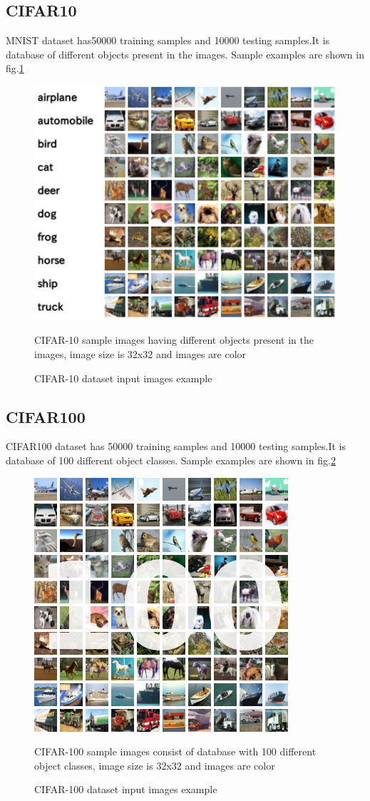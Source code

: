 \subsection{CIFAR10}
MNIST dataset has50000 training samples and 10000 testing samples.It is database of different objects present in the images. Sample examples are shown in fig.\ref{fig:cifar10_example}

\begin{figure}[H]\label{fig:cifar10_example}
	\centering
	\includegraphics[scale=0.8]{Images/cifar10}
	\caption{CIFAR-10 dataset input images example}
	\medskip
	\small
	CIFAR-10 sample images having different objects present in the images, image size is 32x32 and images are color
\end{figure}

\subsection{CIFAR100}
CIFAR100 dataset has 50000 training samples and 10000 testing samples.It is database of 100 different object classes. Sample examples are shown in fig.\ref{fig:cif00_example}

\begin{figure}[H]\label{fig:cif00_example}
	\centering
	\includegraphics[scale=0.8]{Images/cifar_100}
	\caption{CIFAR-100 dataset input images example}
	\medskip
	\small
	CIFAR-100 sample images consist of database with 100 different object classes, image size is 32x32 and images are color 
\end{figure}

